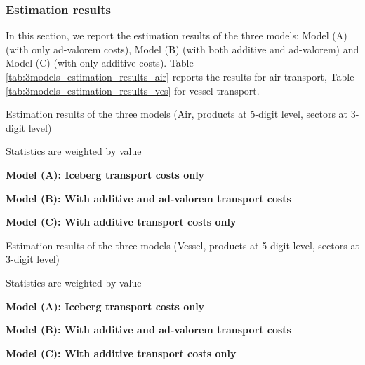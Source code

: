 \documentclass[11pt,twoside, authoryear]{elsarticle}
\begin{document}
\subsubsection{Estimation results}

In this section, we report the estimation results of the three models: Model (A) (with only ad-valorem costs), Model (B) (with both additive and ad-valorem) and Model (C) (with only additive costs). Table \ref{tab:3models_estimation_results_air} reports the results for air transport, Table \ref{tab:3models_estimation_results_ves} for vessel transport.

\setcounter{table}{0}
\renewcommand{\thetable}{A.\arabic{table}}


\begin{table}[htbp]
	\centering
	\footnotesize{
	\caption{Estimation results of the three models (Air, products at 5-digit level, sectors at 3-digit level)}
	\label{tab:3models_estimation_results_air}%
	
   \begin{tablenotes}
	\tiny
	\item Statistics are weighted by value
	\item \textbf{Model (A): Iceberg transport costs only}
	\item \textbf{Model (B): With additive and ad-valorem transport costs}
				\item \textbf{Model (C): With additive transport costs only}
\end{tablenotes}

}	
\end{table}%


\begin{table}[htbp]
	\centering
	\footnotesize{
		\caption{Estimation results of the three models (Vessel, products at 5-digit level, sectors at 3-digit level)}
		\label{tab:3models_estimation_results_ves}%
		
		\begin{tablenotes}
			\tiny
		\item Statistics are weighted by value
		\item \textbf{Model (A): Iceberg transport costs only}
		\item \textbf{Model (B): With additive and ad-valorem transport costs}
		\item \textbf{Model (C): With additive transport costs only}
		\end{tablenotes}
   }
\end{table}%
\end{document}
